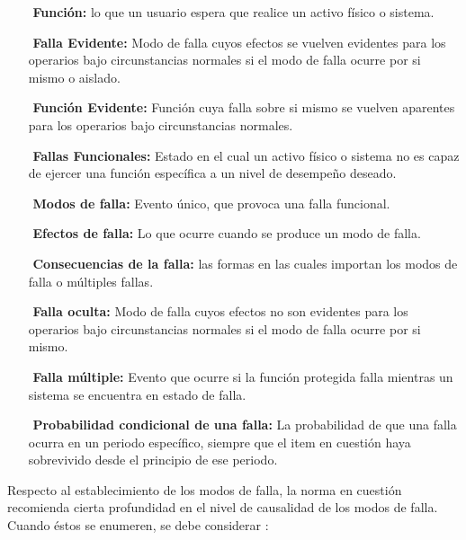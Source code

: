\begin{itemize}
\item[$ $] \textbf{Función:} lo que un usuario espera que realice un activo físico o sistema.
\item[$ $] \textbf{Falla Evidente:} Modo de falla cuyos efectos se vuelven evidentes para los operarios bajo circunstancias normales si el modo de falla ocurre por si mismo o aislado.
\item[$ $] \textbf{Función Evidente:} Función cuya falla sobre si mismo se vuelven aparentes para los operarios bajo circunstancias normales.
\item[$ $] \textbf{Fallas Funcionales:} Estado en el cual un activo físico o sistema no es capaz de ejercer una función específica a un nivel de desempeño deseado.
\item[$ $] \textbf{Modos de falla:} Evento único, que provoca una falla funcional.
\item[$ $] \textbf{Efectos de falla:} Lo que ocurre cuando se produce un modo de falla.
\item[$ $] \textbf{Consecuencias de la falla:} las formas en las cuales importan los modos de falla o múltiples fallas. 
\item[$ $] \textbf{Falla oculta:} Modo de falla cuyos efectos no son evidentes para los operarios bajo circunstancias normales si el modo de falla ocurre por si mismo.
\item[$ $] \textbf{Falla múltiple:} Evento que ocurre si la función protegida falla mientras un sistema se encuentra en estado de falla.
\item[$ $] \textbf{Probabilidad condicional de una falla:} La probabilidad de que una falla ocurra en un periodo específico, siempre que el item en cuestión haya sobrevivido desde el principio de ese periodo.

\end{itemize}

Respecto al establecimiento de los modos de falla, la norma en cuestión recomienda cierta profundidad en el nivel de causalidad de los modos de falla. Cuando éstos se enumeren, se debe considerar \parencite{saeja1011}:\\

